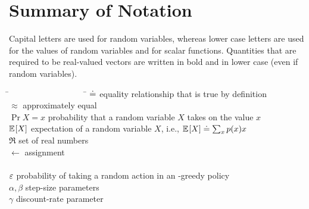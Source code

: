 \documentclass[a4paper, twoside, 12pt]{article}
\begin{document}
\section*{Summary of Notation} 
Capital letters are used for random variables, whereas lower case letters are used for
the values of random variables and for scalar functions. Quantities that are required to
be real-valued vectors are written in bold and in lower case (even if random variables).
\begin{tabbing}
    \=~~~~~~~~~~~~~~~~~~  \= \kill
    \>$\doteq$            \> equality relationship that is true by definition\\
    \>$\approx$           \> approximately equal\\
    \>$\Pr{X\!=\!x}$      \> probability that a random variable $X$ takes on the value $x$\\
    \>$\mathbb{E}_{\,\!\!}\left[X\right]$             \> expectation of a random variable $X$, i.e., $\mathbb{E}_{\,\!\!}\left[X\right]\doteq\sum_x p(x)x$\\
    \>$\Re$               \> set of real numbers\\
    \>$\leftarrow$        \> assignment\\
    \\
    \>$\mbox{$\varepsilon$}$                \> probability of taking a random action in an \e-greedy policy\\
    \>$\alpha, \beta$     \> step-size parameters\\
    \>$\gamma$            \> discount-rate parameter\\

\end{tabbing}
\end{document}
